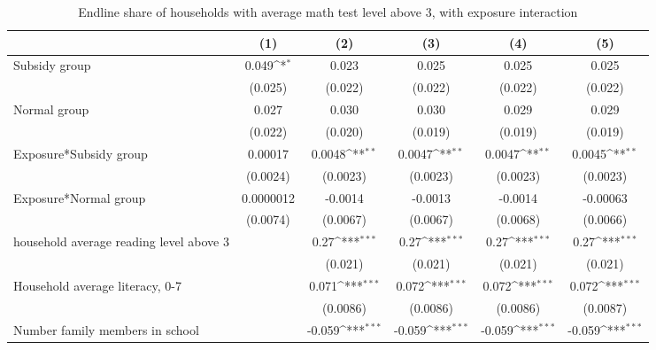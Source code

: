\begin{table}[htbp]\centering
\def\sym#1{\ifmmode^{#1}\else\(^{#1}\)\fi}
\caption{Endline share of households with average math test level above 3, with exposure interaction}
\begin{tabular*}{1\hsize}{@{\hskip\tabcolsep\extracolsep\fill}l*{5}{c}}
\toprule
                &\multicolumn{1}{c}{(1)}         &\multicolumn{1}{c}{(2)}         &\multicolumn{1}{c}{(3)}         &\multicolumn{1}{c}{(4)}         &\multicolumn{1}{c}{(5)}         \\
\midrule
Subsidy group   &    0.049\sym{*}  &    0.023         &    0.025         &    0.025         &    0.025         \\
                &  (0.025)         &  (0.022)         &  (0.022)         &  (0.022)         &  (0.022)         \\
Normal group    &    0.027         &    0.030         &    0.030         &    0.029         &    0.029         \\
                &  (0.022)         &  (0.020)         &  (0.019)         &  (0.019)         &  (0.019)         \\
Exposure*Subsidy group&  0.00017         &   0.0048\sym{**} &   0.0047\sym{**} &   0.0047\sym{**} &   0.0045\sym{**} \\
                & (0.0024)         & (0.0023)         & (0.0023)         & (0.0023)         & (0.0023)         \\
Exposure*Normal group&0.0000012         &  -0.0014         &  -0.0013         &  -0.0014         & -0.00063         \\
                & (0.0074)         & (0.0067)         & (0.0067)         & (0.0068)         & (0.0066)         \\
household average reading level above 3&                  &     0.27\sym{***}&     0.27\sym{***}&     0.27\sym{***}&     0.27\sym{***}\\
                &                  &  (0.021)         &  (0.021)         &  (0.021)         &  (0.021)         \\
Household average literacy, 0-7&                  &    0.071\sym{***}&    0.072\sym{***}&    0.072\sym{***}&    0.072\sym{***}\\
                &                  & (0.0086)         & (0.0086)         & (0.0086)         & (0.0087)         \\
Number family members in school&                  &   -0.059\sym{***}&   -0.059\sym{***}&   -0.059\sym{***}&   -0.059\sym{***}\\

\end{tabular*}
\end{table}
